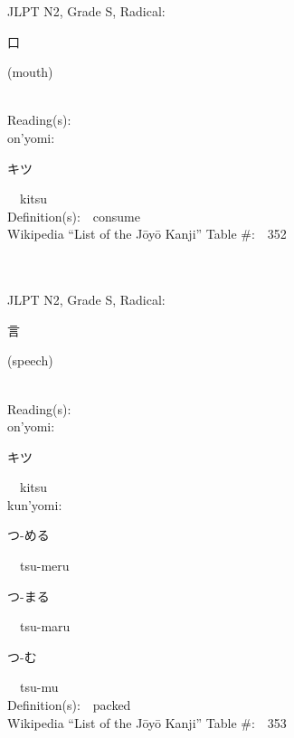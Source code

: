 \begin{multicols}{2}
{JLPT N2, Grade S, Radical:\ \ {\begin{CJK}{UTF8}{min} 口 \end{CJK}} (mouth) } \\
Reading(s):\ \ \\
{\hspace*{1em}}on'yomi:\ \ \\
{\hspace*{2em}}{\begin{CJK}{UTF8}{min} キツ \end{CJK}}\ \ kitsu\ \ \\
Definition(s):\ \ consume \\
Wikipedia ``List of the J\=oy\=o Kanji'' Table \#:\ \ 352 \\
\ \ \\
{\fontsize{34pt}{40pt}  }\ \ \\  %
{JLPT N2, Grade S, Radical:\ \ {\begin{CJK}{UTF8}{min} 言 \end{CJK}} (speech) } \\
Reading(s):\ \ \\
{\hspace*{1em}}on'yomi:\ \ \\
{\hspace*{2em}}{\begin{CJK}{UTF8}{min} キツ \end{CJK}}\ \ kitsu\ \ \\
{\hspace*{1em}}kun'yomi:\ \ \\
{\hspace*{2em}}{\begin{CJK}{UTF8}{min} つ-める \end{CJK}}\ \ tsu-meru\ \ \\
{\hspace*{2em}}{\begin{CJK}{UTF8}{min} つ-まる \end{CJK}}\ \ tsu-maru\ \ \\
{\hspace*{2em}}{\begin{CJK}{UTF8}{min} つ-む \end{CJK}}\ \ tsu-mu\ \ \\
Definition(s):\ \ packed \\
Wikipedia ``List of the J\=oy\=o Kanji'' Table \#:\ \ 353 \\

\end{multicols}
